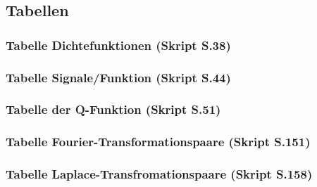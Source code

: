 \documentclass[margin=normal]{tex/hsrzf}
\begin{document}
\subsection{Tabellen}
\subsubsection*{Tabelle Dichtefunktionen (Skript S.38)}
\subsubsection*{Tabelle Signale/Funktion (Skript S.44)}
\subsubsection*{Tabelle der Q-Funktion (Skript S.51)}
\subsubsection*{Tabelle Fourier-Transformationspaare (Skript S.151)}
\subsubsection*{Tabelle Laplace-Transfromationspaare (Skript S.158)}


\end{document}
